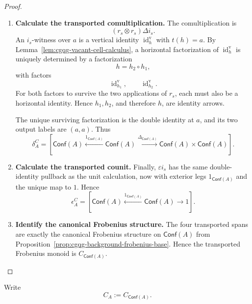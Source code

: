 \documentclass[oneside]{article}
\newcommand{\Conf}{\mathsf{Conf}}
\newcommand{\id}{\operatorname{id}}
\theoremstyle{plain}
\theoremstyle{definition}
\theoremstyle{remark}
\begin{document}
\begin{proof}
\begin{enumerate}[beginpenalty=10000]
        \item \textbf{Calculate the transported comultiplication.} The comultiplication is
        \[
            (r_s\otimes r_s)\Delta i_s.
        \]
        An \(i_s\)-witness over \(a\) is a vertical identity \(\id_h^{\mathrm v}\) with \(t(h)=a\). By Lemma~\ref{lem:cgqg-vacant-cell-calculus}, a horizontal
        factorization of \(\id_h^{\mathrm v}\) is uniquely determined by a factorization
        \[
            h=h_2\circ h_1,
        \]
        with factors
        \[
            \id_{h_1}^{\mathrm v},
            \qquad
            \id_{h_2}^{\mathrm v}.
        \]
        For both factors to survive the two applications of \(r_s\), each must also be a horizontal identity. Hence \(h_1,h_2\), and therefore \(h\), are identity arrows.

        The unique surviving factorization is the double identity at \(a\), and its two output labels are \((a,a)\). Thus
        \[
            \delta_A^C
            =
            \left[
                \Conf(A)
                \xleftarrow{1_{\Conf(A)}}
                \Conf(A)
                \xrightarrow{\Delta_{\Conf(A)}}
                \Conf(A)\times\Conf(A)
            \right].
        \]

        \item \textbf{Calculate the transported counit.} Finally, \(\varepsilon i_s\) has the same double-identity pullback as the unit calculation, now with exterior legs \(1_{\Conf(A)}\) and the unique map to \(1\). Hence
        \[
            \epsilon_A^C
            =
            \left[
                \Conf(A)
                \xleftarrow{1_{\Conf(A)}}
                \Conf(A)
                \xrightarrow{}
                1
            \right].
        \]

        \item \textbf{Identify the canonical Frobenius structure.} The four transported spans are exactly the canonical Frobenius structure on \(\Conf(A)\) from Proposition~\ref{prop:cgqg-background-frobenius-base}. Hence the transported Frobenius monoid is \(C_{\Conf(A)}\). \qedhere
    \end{enumerate}
\end{proof}

Write
\[
    C_A:=C_{\Conf(A)}.
\]
\end{document}
